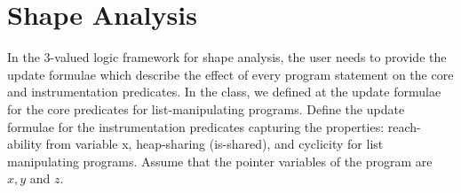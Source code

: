 \section{Shape Analysis}
In the 3-valued logic framework for shape analysis, the user needs to provide the update formulae which describe the effect of every program statement on the core and instrumentation predicates. In the class, we defined at the update formulae for the core predicates for list-manipulating programs. Define the update formulae for the instrumentation predicates capturing the properties: reach-ability from variable x, heap-sharing (is-shared), and cyclicity for list manipulating programs. Assume that the pointer variables of the program are $x,y$ and $z$.